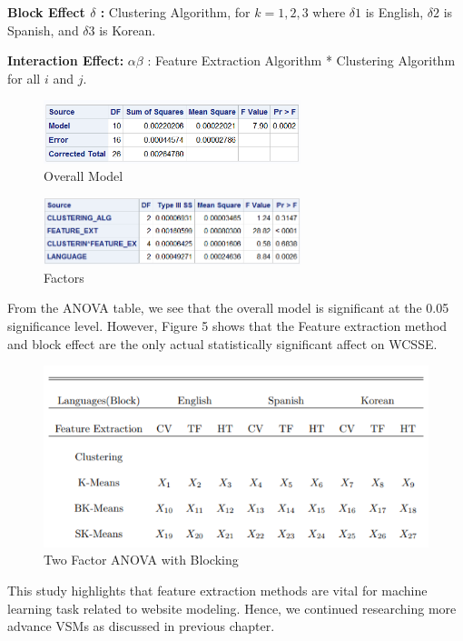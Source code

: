 \documentclass[12pt]{article}
\begin{document}
\textbf{Block Effect $\delta$ :} Clustering Algorithm, for $k = 1,2,3$ where
$\delta{1}$ is English,
$\delta{2}$ is Spanish, and
$\delta{3}$ is Korean.
\vspace{3mm}  

\textbf{Interaction Effect:} 
$\alpha\beta$ : Feature Extraction Algorithm *  Clustering Algorithm for all $i$ and $j$.


\begin{figure}[ht!]
\includegraphics[width=75mm]{anova1.PNG}
    \caption{Overall Model}
\end{figure}


\begin{figure}[ht!]
\includegraphics[width=75mm]{anova2.PNG}
    \caption{Factors}
\end{figure}


From the ANOVA table, we see that the overall model is significant at the 0.05 significance level. However, Figure 5 shows that the Feature extraction method and block effect are the only actual statistically significant affect on WCSSE. 

\begin{figure}[h]
\includegraphics[]{table.PNG}
\caption{Two Factor ANOVA with Blocking}
\end{figure}

This study highlights that feature extraction methods are vital for machine learning task related to website modeling. Hence, we continued researching more advance VSMs as discussed in previous chapter.
\end{document}
